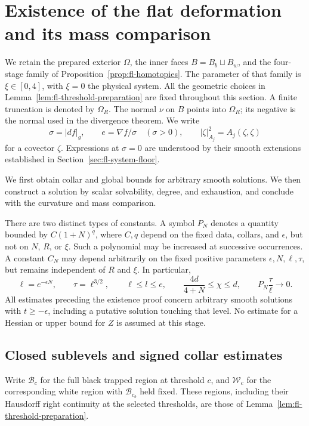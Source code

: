 \section{Existence of the flat deformation and its mass comparison}
\label{sec:fc-existence}

We retain the prepared exterior $\Omega$, the inner faces
$B=B_b\sqcup B_w$, and the four-stage family of
Proposition~\ref{prop:fl-homotopies}.  The parameter of that family is
$\xi\in[0,4]$, with $\xi=0$ the physical system.  All the geometric
choices in Lemma~\ref{lem:fl-threshold-preparation} are fixed throughout
this section.  A finite truncation is denoted by $\Omega_R$.
The normal $\nu$ on $B$ points into $\Omega_R$; its negative is the
normal used in the divergence theorem.  We write
\[
 \sigma=|df|_g,\qquad e=\nabla f/\sigma\quad(\sigma>0),\qquad
 |\zeta|_{A_j}^2=A_j(\zeta,\zeta)
\]
for a covector $\zeta$.  Expressions at $\sigma=0$ are understood by
their smooth extensions established in Section~\ref{sec:fl-system-floor}.

We first obtain collar and global bounds for arbitrary smooth solutions.
We then construct a solution by scalar solvability, degree, and exhaustion,
and conclude with the curvature and mass comparison.

There are two distinct types of constants.  A symbol $P_N$ denotes a
quantity bounded by $C(1+N)^q$, where $C,q$ depend on the fixed data,
collars, and $\epsilon$, but not on $N$, $R$, or $\xi$.  Such a
polynomial may be increased at successive occurrences.  A constant
$C_N$ may depend arbitrarily on the fixed positive parameters
$\epsilon,N,\ell,\tau$, but remains independent of $R$ and $\xi$.
In particular,
\begin{equation}\label{eq:fc-parameter-ledger}
 \ell=e^{-\epsilon N},\qquad \tau=\ell^{3/2},\qquad
 \ell\le l\le e,\qquad
 \frac{4d}{4+N}\le\chi\le d,\qquad
 P_N\frac{\tau}{\ell}\longrightarrow0.
\end{equation}
All estimates preceding the existence proof concern arbitrary smooth
solutions with $t\ge-\epsilon$, including a putative solution touching
that level.  No estimate for a Hessian or upper bound for $Z$ is
assumed at this stage.

\subsection{Closed sublevels and signed collar estimates}

Write $\mathcal B_c$ for the full black trapped region at threshold
$c$, and $\mathcal W_c$ for the corresponding white region with
$\mathcal B_{c_b}$ held fixed.  These regions, including their
Hausdorff right continuity at the selected thresholds, are those of
Lemma~\ref{lem:fl-threshold-preparation}.

